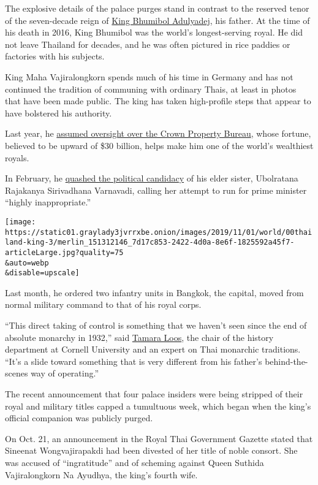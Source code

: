The explosive details of the palace purges stand in contrast to the
reserved tenor of the seven-decade reign of
\href{https://www.nytimes3xbfgragh.onion/2016/10/14/world/asia/thai-king-bhumibol-adulyadej-dies.html?searchResultPosition=3\&module=inline}{King
Bhumibol Adulyadej}, his father. At the time of his death in 2016, King
Bhumibol was the world's longest-serving royal. He did not leave
Thailand for decades, and he was often pictured in rice paddies or
factories with his subjects.

King Maha Vajiralongkorn spends much of his time in Germany and has not
continued the tradition of communing with ordinary Thais, at least in
photos that have been made public. The king has taken high-profile steps
that appear to have bolstered his authority.

Last year, he
\href{https://www.nytimes3xbfgragh.onion/2018/06/17/world/asia/thailand-king-assets.html}{assumed
oversight over the Crown Property Bureau}, whose fortune, believed to be
upward of \$30 billion, helps make him one of the world's wealthiest
royals.

In February, he
\href{https://www.nytimes3xbfgragh.onion/2019/02/08/world/asia/thailand-prime-minister-princess.html}{quashed
the political candidacy} of his elder sister, Ubolratana Rajakanya
Sirivadhana Varnavadi, calling her attempt to run for prime minister
``highly inappropriate.''

\texttt{[image: https://static01.graylady3jvrrxbe.onion/images/2019/11/01/world/00thailand-king-3/merlin\_151312146\_7d17c853-2422-4d0a-8e6f-1825592a45f7-articleLarge.jpg?quality=75\\\&auto=webp\\\&disable=upscale]}

Last month, he ordered two infantry units in Bangkok, the capital, moved
from normal military command to that of his royal corps.

``This direct taking of control is something that we haven't seen since
the end of absolute monarchy in 1932,'' said
\href{https://history.cornell.edu/tamara-loos}{Tamara Loos}, the chair
of the history department at Cornell University and an expert on Thai
monarchic traditions. ``It's a slide toward something that is very
different from his father's behind-the-scenes way of operating.''

The recent announcement that four palace insiders were being stripped of
their royal and military titles capped a tumultuous week, which began
when the king's official companion was publicly purged.

On Oct. 21, an announcement in the Royal Thai Government Gazette stated
that Sineenat Wongvajirapakdi had been divested of her title of noble
consort. She was accused of ``ingratitude'' and of scheming against
Queen Suthida Vajiralongkorn Na Ayudhya, the king's fourth wife.

